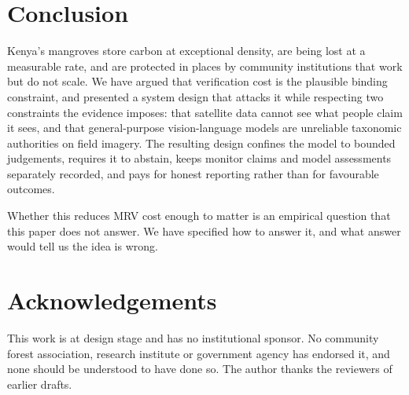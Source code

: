 \documentclass[10pt,twocolumn,a4paper]{article}
\begin{document}
\section{Conclusion}

Kenya's mangroves store carbon at exceptional density, are being lost at a
measurable rate, and are protected in places by community institutions that
work but do not scale. We have argued that verification cost is the plausible
binding constraint, and presented a system design that attacks it while
respecting two constraints the evidence imposes: that satellite data cannot see
what people claim it sees, and that general-purpose vision-language models are
unreliable taxonomic authorities on field imagery. The resulting design confines
the model to bounded judgements, requires it to abstain, keeps monitor claims
and model assessments separately recorded, and pays for honest reporting rather
than for favourable outcomes.

Whether this reduces MRV cost enough to matter is an empirical question that
this paper does not answer. We have specified how to answer it, and what answer
would tell us the idea is wrong.

\section*{Acknowledgements}

This work is at design stage and has no institutional sponsor. No community
forest association, research institute or government agency has endorsed it, and
none should be understood to have done so. The author thanks the reviewers of
earlier drafts.
\end{document}
